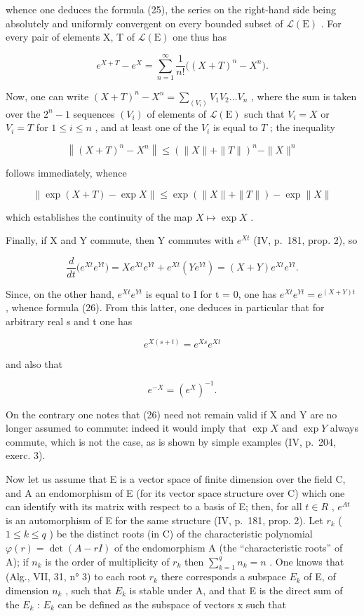 whence one deduces the formula (25), the series on the right-hand side being absolutely and uniformly convergent on every bounded subset of \(\mathcal{L}(\mathrm{E})\) . For every pair of elements X, T of \(\mathcal{L}(\mathrm{E})\) one thus has

\[
e ^ {X + T} - e ^ {X} = \sum_ {n = 1} ^ {\infty} \frac {1}{n !} \big ((X + T) ^ {n} - X ^ {n} \big).
\]

Now, one can write \((X + T)^n - X^n = \sum_{(V_i)} V_1 V_2 \ldots V_n\) , where the sum is taken over the \(2^n - 1\) sequences \((V_i)\) of elements of \(\mathcal{L}(\mathrm{E})\) such that \(V_i = X\) or \(V_i = T\) for \(1 \leqslant i \leqslant n\) , and at least one of the \(V_i\) is equal to \(T\) ; the inequality

\[
\left\| (X + T) ^ {n} - X ^ {n} \right\| \leqslant \left(\| X \| + \| T \|\right) ^ {n} - \| X \| ^ {n}
\]

follows immediately, whence

\[
\| \exp (X + T) - \exp X \| \leqslant \exp \left(\| X \| + \| T \|\right) - \exp \| X \|\tag{28}
\]

which establishes the continuity of the map \(X \mapsto \exp X\) .

Finally, if X and Y commute, then Y commutes with \(e^{Xt}\) (IV, p.~181, prop. 2), so

\[
\frac {d}{d t} \big (e ^ {X t} e ^ {Y t} \big) = X e ^ {X t} e ^ {Y t} + e ^ {X t} (Y e ^ {Y t}) = (X + Y) e ^ {X t} e ^ {Y t}.
\]

Since, on the other hand, \(e^{Xt}e^{Yt}\) is equal to I for t = 0, one has \(e^{Xt}e^{Yt} = e^{(X+Y)t}\) , whence formula (26). From this latter, one deduces in particular that for arbitrary real s and t one has

\[
e ^ {X (s + t)} = e ^ {X s} e ^ {X t}\tag{29}
\]

and also that

\[
e ^ {- X} = \left(e ^ {X}\right) ^ {- 1}.\tag{30}
\]

On the contrary one notes that (26) need not remain valid if X and Y are no longer assumed to commute: indeed it would imply that \(\exp X\) and \(\exp Y\) always commute, which is not the case, as is shown by simple examples (IV, p.~204, exerc. 3).

Now let us assume that E is a vector space of finite dimension over the field C, and A an endomorphism of E (for its vector space structure over C) which one can identify with its matrix with respect to a basis of E; then, for all \(t \in R\) , \(e^{At}\) is an automorphism of E for the same structure (IV, p.~181, prop. 2). Let \(r_k\) ( \(1 \leqslant k \leqslant q\) ) be the distinct roots (in C) of the characteristic polynomial \(\varphi(r) = \det(A - rI)\) of the endomorphism A (the ``characteristic roots'' of A); if \(n_k\) is the order of multiplicity of \(r_k\) then \(\sum_{k=1}^{q} n_k = n\) . One knows that (Alg., VII, 31, n° 3) to each root \(r_k\) there corresponds a subspace \(E_k\) of E, of dimension \(n_k\) , such that \(E_k\) is stable under A, and that E is the direct sum of the \(E_k\) : \(E_k\) can be defined as the subspace of vectors x such that

